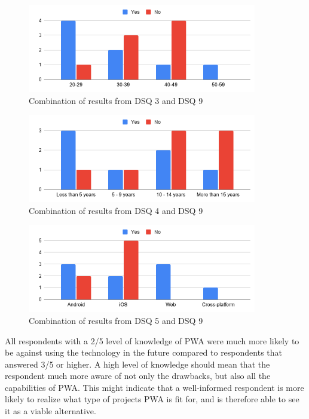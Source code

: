 \documentclass[a4paper,12pt]{article}
\begin{document}
\begin{figure}[ht!]
    \centering
    \includegraphics[width=10cm]{img/Analysis/age.png}
    \caption{Combination of results from DSQ 3 and DSQ 9 }
    \label{fig:analysis_age}
\end{figure}

\begin{figure}[ht!]
    \centering
    \includegraphics[width=10cm]{img/Analysis/exp.png}
    \caption{Combination of results from DSQ 4 and DSQ 9 }
    \label{fig:analysis_exp}
\end{figure}

\begin{figure}[ht!]
    \centering
    \includegraphics[width=10cm]{img/Analysis/job.png}
    \caption{Combination of results from DSQ 5 and DSQ 9 }
    \label{fig:analysis_job}
\end{figure}

All respondents with a 2/5 level of knowledge of PWA were much more likely to be against using the technology in the future compared to respondents that answered 3/5 or higher. A high level of knowledge should mean that the respondent much more aware of not only the drawbacks, but also all the capabilities of PWA. This might indicate that a well-informed respondent is more likely to realize what type of projects PWA is fit for, and is therefore able to see it as a viable alternative.
\end{document}
